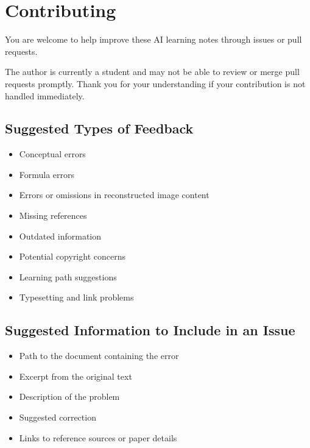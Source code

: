 \hypertarget{contributing}{%
\chapter{Contributing}\label{contributing}}

You are welcome to help improve these AI learning notes through issues or pull requests.

The author is currently a student and may not be able to review or merge pull requests promptly. Thank you for your understanding if your contribution is not handled immediately.

\hypertarget{suggested-types-of-feedback}{%
\section{Suggested Types of Feedback}\label{suggested-types-of-feedback}}

\begin{itemize}
\tightlist
\item
  Conceptual errors
\item
  Formula errors
\item
  Errors or omissions in reconstructed image content
\item
  Missing references
\item
  Outdated information
\item
  Potential copyright concerns
\item
  Learning path suggestions
\item
  Typesetting and link problems
\end{itemize}

\hypertarget{suggested-information-to-include-in-an-issue}{%
\section{Suggested Information to Include in an Issue}\label{suggested-information-to-include-in-an-issue}}

\begin{itemize}
\tightlist
\item
  Path to the document containing the error
\item
  Excerpt from the original text
\item
  Description of the problem
\item
  Suggested correction
\item
  Links to reference sources or paper details
\end{itemize}

